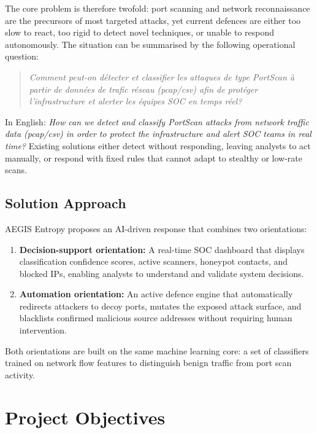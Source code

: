 The core problem is therefore twofold: port scanning and network reconnaissance are the precursors of most targeted attacks, yet current defences are either too slow to react, too rigid to detect novel techniques, or unable to respond autonomously. The situation can be summarised by the following operational question:

\begin{quote}
\textit{Comment peut-on d\'{e}tecter et classifier les attaques de type PortScan \`{a} partir de donn\'{e}es de trafic r\'{e}seau (pcap/csv) afin de prot\'{e}ger l'infrastructure et alerter les \'{e}quipes SOC en temps r\'{e}el?}
\end{quote}

In English: \textit{How can we detect and classify PortScan attacks from network traffic data (pcap/csv) in order to protect the infrastructure and alert SOC teams in real time?} Existing solutions either detect without responding, leaving analysts to act manually, or respond with fixed rules that cannot adapt to stealthy or low-rate scans.

\subsection{Solution Approach}

AEGIS Entropy proposes an AI-driven response that combines two orientations:

\begin{enumerate}
    \item \textbf{Decision-support orientation:} A real-time SOC dashboard that displays classification confidence scores, active scanners, honeypot contacts, and blocked IPs, enabling analysts to understand and validate system decisions.
    \item \textbf{Automation orientation:} An active defence engine that automatically redirects attackers to decoy ports, mutates the exposed attack surface, and blacklists confirmed malicious source addresses without requiring human intervention.
\end{enumerate}

Both orientations are built on the same machine learning core: a set of classifiers trained on network flow features to distinguish benign traffic from port scan activity.

\section{Project Objectives}

